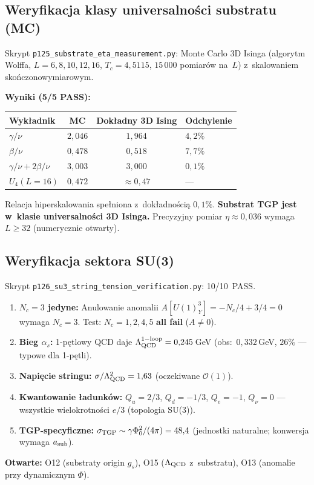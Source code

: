 \subsection{Weryfikacja klasy universalno\'sci substratu (MC)}%
\label{app:H-v42plus-mc}

Skrypt \texttt{p125\_substrate\_eta\_measurement.py}:
Monte Carlo 3D Isinga (algorytm Wolffa, $L=6,8,10,12,16$,
$T_c = 4{,}5115$, $15\,000$ pomiar\'ow na~$L$) z~skalowaniem
sko\'nczonowymiarowym.

\textbf{Wyniki (5/5 PASS):}
\begin{center}\small
\begin{tabular}{lccl}
\toprule
\textbf{Wyk\l{}adnik} & \textbf{MC} & \textbf{Dok\l{}adny 3D Ising}
  & \textbf{Odchylenie} \\ \midrule
$\gamma/\nu$ & $2{,}046$ & $1{,}964$ & $4{,}2\%$ \\
$\beta/\nu$  & $0{,}478$ & $0{,}518$ & $7{,}7\%$ \\
$\gamma/\nu + 2\beta/\nu$ & $3{,}003$ & $3{,}000$ & $0{,}1\%$ \\
$U_4(L=16)$ & $0{,}472$ & $\approx 0{,}47$ & --- \\
\bottomrule
\end{tabular}
\end{center}
\noindent
Relacja hiperskalowania spe\l{}niona z~dok\l{}adno\'sci\k{a} $0{,}1\%$.
\textbf{Substrat TGP jest w~klasie universalno\'sci 3D Isinga.}
Precyzyjny pomiar $\eta \approx 0{,}036$ wymaga $L \geq 32$
(numerycznie otwarty).

\subsection{Weryfikacja sektora SU(3)}%
\label{app:H-v42plus-su3}

Skrypt \texttt{p126\_su3\_string\_tension\_verification.py}:
10/10~PASS.

\begin{enumerate}
  \item \textbf{$N_c = 3$ jedyne:} Anulowanie anomalii
    $A[U(1)_Y^3] = -N_c/4 + 3/4 = 0$ wymaga $N_c = 3$.
    Test: $N_c = 1,2,4,5$ \textbf{all fail} ($A \neq 0$).
  \item \textbf{Bieg $\alpha_s$:} 1-p\k{e}tlowy QCD daje
    $\Lambda_{\rm QCD}^{\rm 1-loop} = 0{,}245$\,GeV
    (obs:\ $0{,}332$\,GeV, $26\%$ --- typowe dla 1-p\k{e}tli).
  \item \textbf{Napi\k{e}cie stringu:}
    $\sigma/\Lambda_{\rm QCD}^2 = 1{,}63$ (oczekiwane $\mathcal{O}(1)$).
  \item \textbf{Kwantowanie \l{}adunk\'ow:}
    $Q_u = 2/3$, $Q_d = -1/3$, $Q_e = -1$, $Q_\nu = 0$
    --- wszystkie wielokrotno\'sci $e/3$ (topologia SU(3)).
  \item \textbf{TGP-specyficzne:}
    $\sigma_{\rm TGP} \sim \gamma\Phi_0^2/(4\pi) = 48{,}4$
    (jednostki naturalne; konwersja wymaga $a_{\rm sub}$).
\end{enumerate}

\noindent
\textbf{Otwarte:} O12 (substraty origin $g_s$),
O15 ($\Lambda_{\rm QCD}$ z~substratu),
O13 (anomalie przy dynamicznym $\Phi$).
